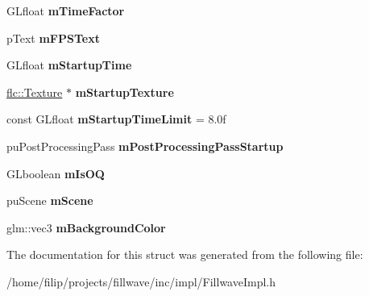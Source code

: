 \begin{DoxyCompactItemize}
G\+Lfloat {\bfseries m\+Time\+Factor}
\item 
\mbox{\label{structflw_1_1Engine_1_1EngineImpl_a9bf706002acb60b0a814703f76b34f7c}} 
p\+Text {\bfseries m\+F\+P\+S\+Text}
\item 
\mbox{\label{structflw_1_1Engine_1_1EngineImpl_a35a75d539b91516903430800c785fb6d}} 
G\+Lfloat {\bfseries m\+Startup\+Time}
\item 
\mbox{\label{structflw_1_1Engine_1_1EngineImpl_a91572207ce28aece4512bea9b5fd4255}} 
\hyperlink{classflw_1_1flc_1_1Texture}{flc\+::\+Texture} $\ast$ {\bfseries m\+Startup\+Texture}
\item 
\mbox{\label{structflw_1_1Engine_1_1EngineImpl_aec65b0b92c90bfa4d02ab7209f705c07}} 
const G\+Lfloat {\bfseries m\+Startup\+Time\+Limit} = 8.\+0f
\item 
\mbox{\label{structflw_1_1Engine_1_1EngineImpl_a0335d7d2c148ddb43fbbdb2f9edd37d1}} 
pu\+Post\+Processing\+Pass {\bfseries m\+Post\+Processing\+Pass\+Startup}
\item 
\mbox{\label{structflw_1_1Engine_1_1EngineImpl_accd81c47bb4d498f9553de8bfb10dcaa}} 
G\+Lboolean {\bfseries m\+Is\+OQ}
\item 
\mbox{\label{structflw_1_1Engine_1_1EngineImpl_a96b18da35e79c7bc1a319f4b562a9b21}} 
pu\+Scene {\bfseries m\+Scene}
\item 
\mbox{\label{structflw_1_1Engine_1_1EngineImpl_a6919df7b28894958ae3aa80cebf3173b}} 
glm\+::vec3 {\bfseries m\+Background\+Color}
\end{DoxyCompactItemize}


The documentation for this struct was generated from the following file\+:\begin{DoxyCompactItemize}
\item 
/home/filip/projects/fillwave/inc/impl/Fillwave\+Impl.\+h\end{DoxyCompactItemize}
